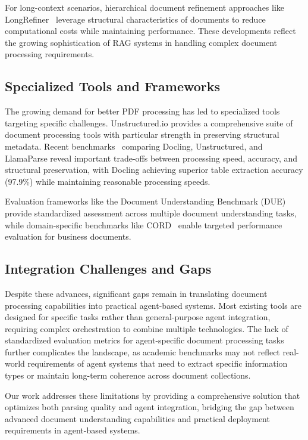 \documentclass{article}
\begin{document}
For long-context scenarios, hierarchical document refinement approaches like LongRefiner~\cite{jin2025hierarchical} leverage structural characteristics of documents to reduce computational costs while maintaining performance. These developments reflect the growing sophistication of RAG systems in handling complex document processing requirements.

\subsection{Specialized Tools and Frameworks}

The growing demand for better PDF processing has led to specialized tools targeting specific challenges. Unstructured.io provides a comprehensive suite of document processing tools with particular strength in preserving structural metadata. Recent benchmarks~\cite{procycons2024benchmark} comparing Docling, Unstructured, and LlamaParse reveal important trade-offs between processing speed, accuracy, and structural preservation, with Docling achieving superior table extraction accuracy (97.9\%) while maintaining reasonable processing speeds.

Evaluation frameworks like the Document Understanding Benchmark (DUE)~\cite{borchmann2021due} provide standardized assessment across multiple document understanding tasks, while domain-specific benchmarks like CORD~\cite{park2019cord} enable targeted performance evaluation for business documents.

\subsection{Integration Challenges and Gaps}

Despite these advances, significant gaps remain in translating document processing capabilities into practical agent-based systems. Most existing tools are designed for specific tasks rather than general-purpose agent integration, requiring complex orchestration to combine multiple technologies. The lack of standardized evaluation metrics for agent-specific document processing tasks further complicates the landscape, as academic benchmarks may not reflect real-world requirements of agent systems that need to extract specific information types or maintain long-term coherence across document collections.

Our work addresses these limitations by providing a comprehensive solution that optimizes both parsing quality and agent integration, bridging the gap between advanced document understanding capabilities and practical deployment requirements in agent-based systems.
\end{document}
